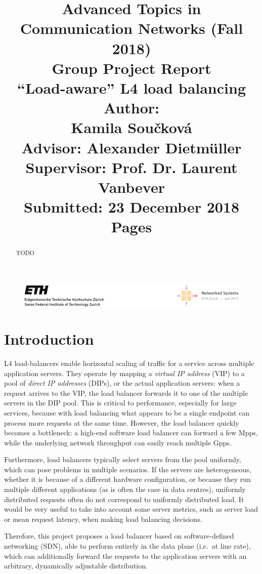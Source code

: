 \documentclass[11pt,oneside,a4paper]{article}
\title{
    \vspace*{0.0mm}
    \LARGE\bf\sf Advanced Topics in \\Communication Networks (Fall 2018)
    \vspace*{10.0mm} \\
    \Large\bf\sf Group Project Report \vspace*{30.0mm}\\
    \Huge\bf\sf ``Load-aware'' L4 load balancing
    \vspace*{30.0mm} \\
    \normalsize
    \sf Author:\\[5pt]
    \sf Kamila Sou\v{c}kov\'{a} \\ [5pt]
    \sf  Advisor:  Alexander Dietm\"{u}ller \vspace*{5mm}\\
    \sf  Supervisor:  Prof. Dr. Laurent Vanbever \vspace*{20.0mm}\\
    \sf Submitted: 23 December 2018\\ [5pt]
    \sf \pageref{lastpage} Pages
}
\date{}
\begin{document}
\begin{figure}
    \includegraphics[width=\textwidth]{figures/eth-nsg-header}
\end{figure}

\maketitle
\thispagestyle{empty}
\raggedbottom
\clearpage


\begin{abstract}
    TODO
    \lipsum[1-3]
\end{abstract}

\clearpage
\setcounter{tocdepth}{2}
\tableofcontents
\clearpage
{}

\section{Introduction}
L4 load-balancers enable horizontal scaling of traffic for a service across
multiple application servers.
They operate by mapping a \emph{virtual IP address} (VIP) to a pool of
\emph{direct IP addresses} (DIPs), or the actual application servers: when a
request arrives to the VIP, the load balancer forwards it to one of the multiple
servers in the DIP pool.
This is critical to performance, especially for large services, because with
load balancing what appears to be a single endpoint can process more requests at
the same time.
However, the load balancer quickly becomes a bottleneck: a high-end software
load balancer can forward a few Mpps, while the underlying network throughput
can easily reach multiple Gpps.\cite{maglev}

Furthermore, load balancers typically select servers from the pool uniformly,
which can pose problems in multiple scenarios.  If the servers are
heterogeneous, whether it is because of a different hardware configuration, or
because they run multiple different applications (as is often the case in data
centres), uniformly distributed requests often do not correspond to uniformly
distributed load.
It would be very useful to take into account some server metrics, such as server
load or mean request latency, when making load balancing decisions.

Therefore, this project proposes a load balancer based on software-defined
networking (SDN), able to perform entirely in the data plane (i.e.~at line
rate), which can additionally forward the requests to the application servers
with an arbitrary, dynamically adjustable distribution.
\end{document}
